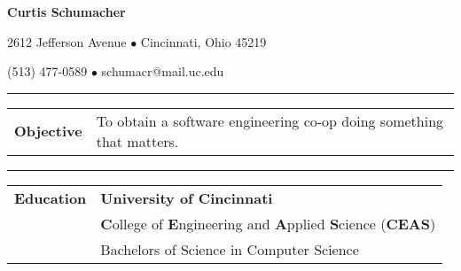 \documentclass[11pt]{article} %
\begin{document}
	\huge{\centerline{\textbf{Curtis Schumacher}}}
	\large
	\centerline{2612 Jefferson Avenue $\bullet$ Cincinnati, Ohio 45219}
	\centerline{(513) 477-0589 $\bullet$ schumacr@mail.uc.edu}
	\vspace*{1\baselineskip}\hrule\vspace*{1\baselineskip}
\begin{small}	
	\begin{tabular}[t]{p{3cm} p{16cm}}\large{\textbf{Objective}}
				& To obtain a software engineering co-op doing something that matters. \\
	\end{tabular}
	
			\vspace*{1\baselineskip}\hrule\vspace*{1\baselineskip}
	\begin{tabular}[t]{p{3cm} p{16cm}}\large{\textbf{Education}}
    				& \textbf{University of Cincinnati} \color{gray}{Class of 2016}\\
    				& \textbf{C}ollege of \textbf{E}ngineering and \textbf{A}pplied \textbf{S}cience (\textbf{CEAS}) \\
    				& Bachelors of Science in Computer Science \\
			\end{tabular}
			

\end{small}
\end{document}
